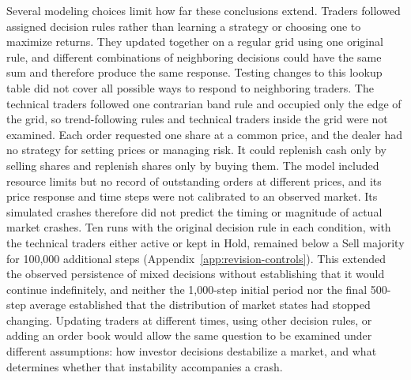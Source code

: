 Several modeling choices limit how far these conclusions extend. Traders
followed assigned decision rules rather than learning a strategy or choosing
one to maximize returns. They updated together on a regular grid using one
original rule, and different combinations of neighboring decisions could
have the same sum and therefore produce the same response. Testing changes
to this lookup table did not cover all possible ways to respond to
neighboring traders. The technical traders followed one contrarian band
rule and occupied only the edge of the grid, so trend-following rules and
technical traders inside the grid were not examined. Each order requested one share at a common price, and
the dealer had no strategy for setting prices or managing risk. It could
replenish cash only by selling shares and replenish shares only by buying
them. The model included resource limits but no record of outstanding orders
at different prices, and its price response and time steps were not
calibrated to an observed market. Its simulated crashes therefore did not
predict the timing or magnitude of actual market crashes. Ten runs with the original decision rule in each condition, with the
technical traders either active or kept in Hold, remained below a Sell majority for 100,000 additional steps (Appendix~\ref{app:revision-controls}). This
extended the observed persistence of mixed decisions without establishing
that it would continue indefinitely, and neither the 1,000-step initial
period nor the final 500-step average established that the distribution of
market states had stopped changing. Updating traders at different times,
using other decision rules, or adding an order book would allow the same
question to be examined under different assumptions: how investor decisions
destabilize a market, and what determines whether that instability
accompanies a crash.
